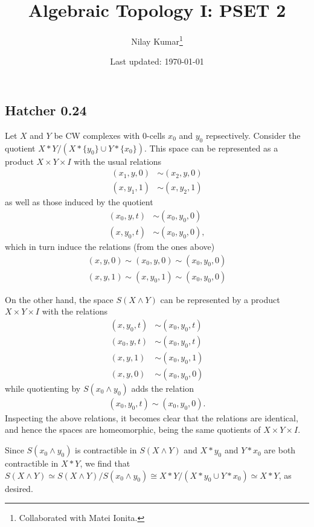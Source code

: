 \documentclass{../mathnotes}
\title{Algebraic Topology I: PSET 2}
\author{Nilay Kumar\footnote{Collaborated with Matei Ionita.}}
\date{Last updated: \today}
\begin{document}
\maketitle

\subsection*{Hatcher 0.24}
Let $X$ and $Y$ be CW complexes with 0-cells $x_0$ and $y_0$ repsectively. Consider the quotient
$X*Y/(X*\{y_0\}\cup Y*\{x_0\})$. This space can be represented as a product $X\times Y\times I$
with the usual relations
\begin{align*}
    (x_1,y,0)&\sim (x_2,y,0)\\
    (x,y_1,1)&\sim (x,y_2,1)
\end{align*}
as well as those induced by the quotient
\begin{align*}
    (x_0,y,t)&\sim(x_0,y_0,0)\\
    (x,y_0,t)&\sim(x_0,y_0,0),
\end{align*}
which in turn induce the relations (from the ones above)
\begin{align*}
    (x,y,0)\sim(x_0,y,0)\sim(x_0,y_0,0)\\
    (x,y,1)\sim(x,y_0,1)\sim(x_0,y_0,0)
\end{align*}

On the other hand, the space $S(X\wedge Y)$ can be represented by a product $X\times Y\times I$
with the relations
\begin{align*}
    (x,y_0,t) &\sim(x_0,y_0,t)\\
    (x_0,y,t) &\sim(x_0,y_0,t)\\
    (x,y,1) &\sim(x_0,y_0,1)\\
    (x,y,0) &\sim (x_0,y_0,0)
\end{align*}
while quotienting by $S(x_0\wedge y_0)$ adds the relation
\begin{align*}
    (x_0,y_0,t)\sim (x_0,y_0,0).
\end{align*}
Inspecting the above relations, it becomes clear that the relations are identical, and
hence the spaces are homeomorphic, being the same quotients of $X\times Y\times I$.

Since $S(x_0\wedge y_0)$ is contractible in $S(X\wedge Y)$ and $X*y_0$ and $Y*x_0$ are both contractible
in $X*Y$, we find that $S(X\wedge Y)\simeq S(X\wedge Y)/S(x_0\wedge y_0)\cong X*Y/(X*y_0\cup Y*x_0)\simeq X*Y$,
as desired.
\end{document}
